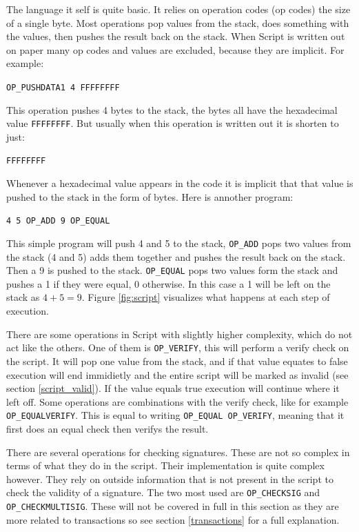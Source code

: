 The language it self is quite basic. It relies on operation codes (op codes) the size of a single byte. Most operations pop values from the stack, does something with the values, then pushes the result back on the stack. When Script is written out on paper many op codes and values are excluded, because they are implicit. For example: 

\texttt{OP\_PUSHDATA1 4 FFFFFFFF} 

This operation pushes 4 bytes to the stack, the bytes all have the hexadecimal value \texttt{FFFFFFFF}. But usually when this operation is written out it is shorten to just:

\texttt{FFFFFFFF} 

Whenever a hexadecimal value appears in the code it is implicit that that value is pushed to the stack in the form of bytes. Here is annother program:

\texttt{4 5 OP\_ADD 9 OP\_EQUAL}

This simple program will push 4 and 5 to the stack, \texttt{OP\_ADD} pops two values from the stack (4 and 5) adds them together and pushes the result back on the stack. Then a 9 is pushed to the stack. \texttt{OP\_EQUAL} pops two values form the stack and pushes a 1 if they were equal, 0 otherwise. In this case a 1 will be left on the stack as $4 + 5 = 9$. Figure \ref{fig:script} visualizes what happens at each step of execution.

There are some operations in Script with slightly higher complexity, which do not act like the others. One of them is \texttt{OP\_VERIFY}, this will perform a verify check on the script. It will pop one value from the stack, and if that value equates to false execution will end immidietly and the entire script will be marked as invalid (see section \ref{script_valid}). If the value equals true execution will continue where it left off. Some operations are combinations with the verify check, like for example \texttt{OP\_EQUALVERIFY}. This is equal to writing \texttt{OP\_EQUAL OP\_VERIFY}, meaning that it first does an equal check then verifys the result.

There are several operations for checking signatures. These are not so complex in terms of what they do in the script. Their implementation is quite complex however. They rely on outside information that is not present in the script to check the validity of a signature. The two most used are \texttt{OP\_CHECKSIG} and \texttt{OP\_CHECKMULTISIG}. These will not be covered in full in this section as they are more related to transactions so see section \ref{transactions} for a full explanation. 

